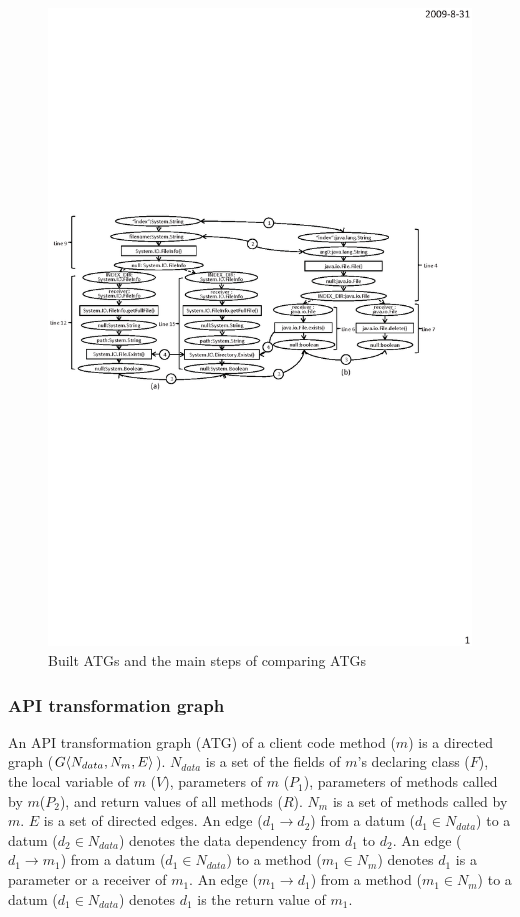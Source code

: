 \begin{figure}[t]
\centering
\includegraphics[scale=1.1,clip]{figure/graph.eps}\vspace*{-3ex}
 \caption
{\label{fig:graph}Built ATGs and the main steps of comparing
ATGs}\vspace*{-3.5ex}
\end{figure}

\subsubsection{API transformation graph} An API transformation graph
(ATG) of a client code method ($m$) is a directed graph
($G\langle N_{data}, N_{m}, E \rangle$). $N_{data}$ is a set of the fields
of $m$'s declaring class ($F$), the local variable of $m$ ($V$),
parameters of $m$ ($P_1$), parameters of methods called by
$m$($P_2$), and return values of all methods ($R$). $N_{m}$ is a set
of methods called by $m$. $E$ is a set of directed edges. An edge
($d_1\rightarrow d_2$) from a datum ($d_1 \in N_{data}$) to a datum
($d_2 \in N_{data}$) denotes the data dependency from $d_1$ to
$d_2$. An edge ($d_1 \rightarrow m_1$) from a datum ($d_1 \in
N_{data}$)  to a method ($ m_1 \in N_{m}$) denotes $d_1$ is a
parameter or a receiver of $m_1$. An edge ($m_1 \rightarrow d_1$)
from a method ($ m_1 \in N_{m}$) to a datum ($d_1 \in N_{data}$)
denotes $d_1$ is the return value of $m_1$.


